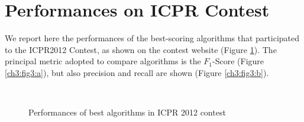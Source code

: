 \clearpage

\section{Performances on ICPR Contest}
\label{ch3:icpr_perf}

We report here the performances of the best-scoring algorithms that participated to the ICPR2012 Contest, as shown on the contest website (Figure \ref{ch3:fig3}).
The principal metric adopted to compare algorithms is the $F_1$-Score (Figure \ref{ch3:fig3:a}), but also precision and recall are shown (Figure \ref{ch3:fig3:b}). 

\begin{figure}[!htb]
  \centering
    \\
    \caption{Performances of best algorithms in ICPR 2012 contest}
    \label{ch3:fig3}
\end{figure}















